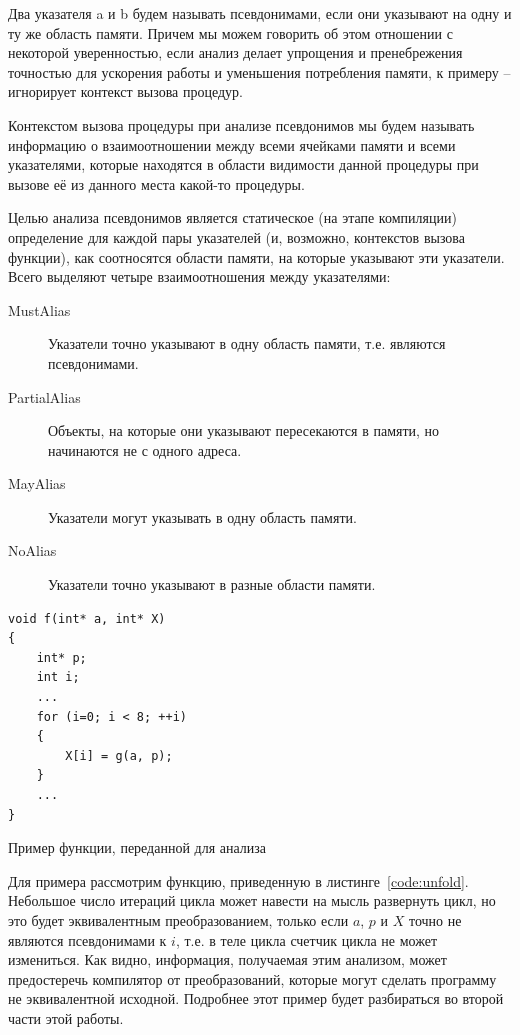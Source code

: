\begin{mydefinition}
Два указателя a и b будем называть псевдонимами, если они указывают на одну и ту же область памяти. Причем мы можем говорить об этом отношении с некоторой уверенностью, если анализ делает упрощения и пренебрежения точностью для ускорения работы и уменьшения потребления памяти, к примеру -- игнорирует контекст вызова процедур.
\end{mydefinition}

\begin{mydefinition}
Контекстом вызова процедуры при анализе псевдонимов мы будем называть информацию о взаимоотношении между всеми ячейками памяти и всеми указателями, которые находятся в области видимости данной процедуры при вызове её из данного места какой-то процедуры. 
\end{mydefinition}

Целью анализа псевдонимов является статическое (на этапе компиляции) определение для каждой пары указателей (и, возможно, контекстов вызова функции), как соотносятся области памяти, на которые указывают эти указатели. Всего выделяют четыре взаимоотношения между указателями:
\begin{description}
  \item[MustAlias] Указатели точно указывают в одну область памяти, т.е. являются псевдонимами.
  \item[PartialAlias] Объекты, на которые они указывают пересекаются в памяти, но начинаются не с одного адреса.
  \item[MayAlias] Указатели могут указывать в одну область памяти.
  \item[NoAlias] Указатели точно указывают в разные области памяти.
\end{description}

\begin{ListingEnv}[H]
\begin{lstlisting}
void f(int* a, int* X)
{
    int* p;
    int i;
    ...
    for (i=0; i < 8; ++i)
    {
        X[i] = g(a, p);
    }
    ...
}
\end{lstlisting}
\caption{Пример функции, переданной для анализа}
\label{code:unfold}
\end{ListingEnv}

\begin{myexample}
Для примера рассмотрим функцию, приведенную в листинге~\ref{code:unfold}. Небольшое число итераций цикла может навести на мысль развернуть цикл, но это будет эквивалентным преобразованием, только если $a$, $p$ и $X$ точно не являются псевдонимами к $i$, т.е. в теле цикла счетчик цикла не может измениться. Как видно, информация, получаемая этим анализом, может предостеречь компилятор от преобразований, которые могут сделать программу не эквивалентной исходной. Подробнее этот пример будет разбираться во второй части этой работы.
\label{ex:unfold}
\end{myexample}

